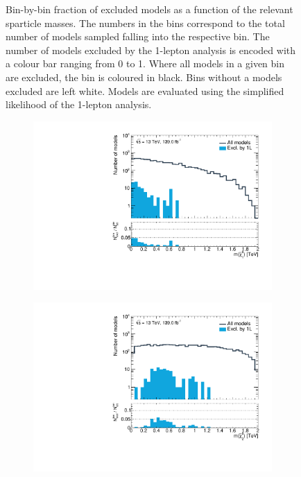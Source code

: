 \begin{figure}
\begin{subfigure}[b]{0.5\linewidth}
	\end{subfigure}\hfill
	\caption{Bin-by-bin fraction of excluded models as a function of the relevant sparticle masses. The numbers in the bins correspond to the total number of models sampled falling into the respective bin. The number of models excluded by the 1-lepton analysis is encoded with a colour bar ranging from 0 to 1. Where all models in a given bin are excluded, the bin is coloured in black. Bins without a models excluded are left white. Models are evaluated using the simplified likelihood of the 1-lepton analysis.}
	\label{fig:impact_electroweakinos_2D}
\end{figure}

 \begin{figure}
	\centering
	\begin{subfigure}[b]{0.5\linewidth}
		\centering\includegraphics[width=\textwidth]{1D/m_chi_10}
	\end{subfigure}\hfill
	\begin{subfigure}[b]{0.5\linewidth}
		\centering\includegraphics[width=\textwidth]{1D/m_chi_20}

\end{subfigure}
\end{figure}
